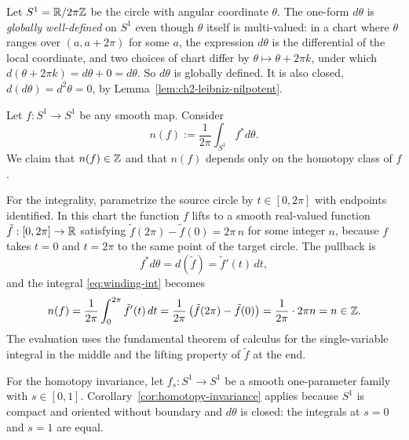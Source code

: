 \begin{example}\label{ex:ch2-winding}
Let $S^1 = \mathbb{R} / 2\pi\mathbb{Z}$ be the circle with angular coordinate $\theta$. The one-form $d\theta$ is \emph{globally well-defined} on $S^1$ even though $\theta$ itself is multi-valued: in a chart where $\theta$ ranges over $(a, a + 2\pi)$ for some $a$, the expression $d\theta$ is the differential of the local coordinate, and two choices of chart differ by $\theta \mapsto \theta + 2\pi k$, under which $d(\theta + 2\pi k) = d\theta + 0 = d\theta$. So $d\theta$ is globally defined. It is also closed, $d(d\theta) = d^2\theta = 0$, by Lemma~\ref{lem:ch2-leibniz-nilpotent}.

\medskip

\noindent Let $f : S^1 \to S^1$ be any smooth map. Consider
\begin{equation}\label{eq:winding-int}
n(f) := \frac{1}{2\pi} \int_{S^1} f^* d\theta.
\end{equation}
We claim that $n(f) \in \mathbb{Z}$ and that $n(f)$ depends only on the homotopy class of $f$.

\medskip

\noindent For the integrality, parametrize the source circle by $t \in [0, 2\pi]$ with endpoints identified. In this chart the function $f$ lifts to a smooth real-valued function $\tilde f : [0, 2\pi] \to \mathbb{R}$ satisfying $\tilde f(2\pi) - \tilde f(0) = 2\pi\, n$ for some integer $n$, because $f$ takes $t = 0$ and $t = 2\pi$ to the same point of the target circle. The pullback is
\begin{equation*}
f^* d\theta = d(\tilde f) = \tilde f'(t)\, dt,
\end{equation*}
and the integral \eqref{eq:winding-int} becomes
\begin{equation*}
n(f) = \frac{1}{2\pi} \int_0^{2\pi} \tilde f'(t)\,dt = \frac{1}{2\pi} \left(\tilde f(2\pi) - \tilde f(0)\right) = \frac{1}{2\pi} \cdot 2\pi n = n \in \mathbb{Z}.
\end{equation*}
The evaluation uses the fundamental theorem of calculus for the single-variable integral in the middle and the lifting property of $\tilde f$ at the end.

\medskip

\noindent For the homotopy invariance, let $f_s : S^1 \to S^1$ be a smooth one-parameter family with $s \in [0, 1]$. Corollary~\ref{cor:homotopy-invariance} applies because $S^1$ is compact and oriented without boundary and $d\theta$ is closed: the integrals at $s = 0$ and $s = 1$ are equal.


\end{example}
